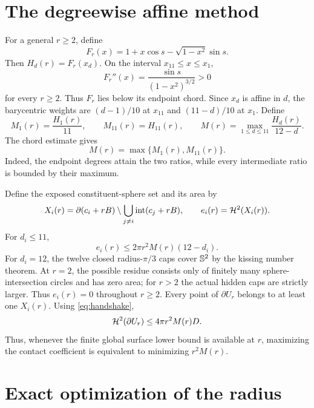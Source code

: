 \section{The degreewise affine method}
\label{sec:method}

For a general $r\ge2$, define
\begin{equation}\label{eq:Fr}
 F_r(x)=1+x\cos s-\sqrt{1-x^2}\sin s.
\end{equation}
Then $H_d(r)=F_r(x_d)$.  On the interval $x_{11}\le x\le x_1$,
\begin{equation}\label{eq:convexity}
 F_r''(x)=\frac{\sin s}{(1-x^2)^{3/2}}>0
\end{equation}
for every $r\ge2$.  Thus $F_r$ lies below its endpoint chord.  Since $x_d$ is affine in $d$, the
barycentric weights are $(d-1)/10$ at $x_{11}$ and $(11-d)/10$ at $x_1$.
Define
\[
 M_1(r)=\frac{H_1(r)}{11},
 \qquad
 M_{11}(r)=H_{11}(r),
 \qquad
 M(r)=\max_{1\le d\le11}\frac{H_d(r)}{12-d}.
\]
The chord estimate gives
\begin{equation}\label{eq:endpointreduction}
 \boxed{M(r)=\max\{M_1(r),M_{11}(r)\}.}
\end{equation}
Indeed, the endpoint degrees attain the two ratios, while every intermediate
ratio is bounded by their maximum.

Define the exposed constituent-sphere set and its area by
\[
 X_i(r)=\partial(c_i+rB)\setminus
        \bigcup_{j\ne i}\operatorname{int}(c_j+rB),
 \qquad
 e_i(r)=\mathcal H^2(X_i(r)).
\]
For $d_i\le11$,
\[
 e_i(r)\le2\pi r^2M(r)(12-d_i).
\]
For $d_i=12$, the twelve closed radius-$\pi/3$ caps cover $\mathbb S^2$ by the kissing
number theorem.  At $r=2$, the possible residue consists only of finitely many
sphere-intersection circles and has zero area; for $r>2$ the actual hidden caps are
strictly larger.  Thus $e_i(r)=0$ throughout $r\ge2$.  Every point of
$\partial U_r$ belongs to at least one $X_i(r)$.  Using \cref{eq:handshake},
\begin{equation}\label{eq:surfaceuppergeneral}
 \mathcal H^2(\partial U_r)
 \le4\pi r^2M(r)D.
\end{equation}
Thus, whenever the finite global surface lower bound is available at $r$,
maximizing the contact coefficient is equivalent to minimizing $r^2M(r)$.

\section{Exact optimization of the radius}
\label{sec:optimizer}

